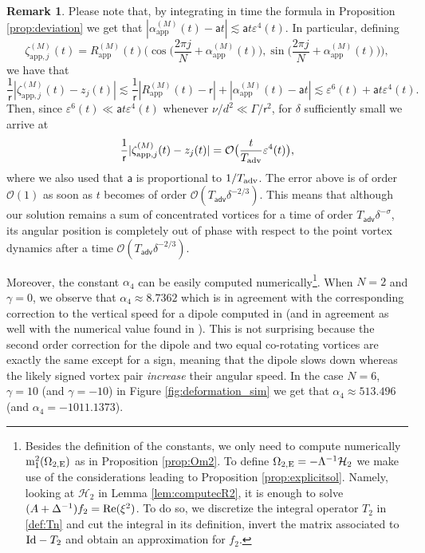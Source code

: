 \documentclass[11pt,reqno,a4paper]{amsart}
\def\eps{\varepsilon}
\def\Re{{\rm Re}}
\newcommand{\cH}{\mathcal{H}}
\newcommand{\cO}{\mathcal{O}}
\newcommand{\adv}{\mathsf{adv}}
\newcommand{\app}{\mathrm{app}}
\newcommand{\mrm}{\mathrm{m}}
\newcommand{\1}{\mathbbm{1}}
\theoremstyle{definition}
\newtheorem{remark}[proposition]{Remark}
\theoremstyle{definition}
\numberwithin{equation}{section}
\newcommand{\Mapp}[2]{#1^{(#2)}_\mathrm{app}}
\begin{document}
\begin{remark}\label{rem:delta23}
    Please note that, by integrating in time the formula in Proposition \ref{prop:deviation} we get that
    $|\Mapp{\alpha}{M}(t) - \mathsf{a}t| \lesssim \mathsf{a} t \eps^4(t)$. In particular, defining
    \begin{equation}
        \zeta^{(M)}_{\app,j}(t) = \Mapp{R}{M}(t)\Big(\cos\Big(\frac{2\pi j}{N}+\Mapp{\alpha}{M}(t)\Big) ,\sin\Big(\frac{2\pi j}{N}+\Mapp{\alpha}{M}(t) \Big) \Big),
    \end{equation}
    we have that
    \begin{equation}
        \frac{1}{\mathsf{r}}|\zeta^{(M)}_{\app,j}(t) - z_j(t)| \lesssim \frac{1}{\mathsf{r}}|\Mapp{R}{M}(t)-\mathsf{r}|+ | \Mapp{\alpha}{M}(t) - \mathsf{a}t| \lesssim  \eps^6(t)+ \mathsf{a}t \eps^4(t).
    \end{equation}
    Then, since $\eps^6(t)\ll \mathsf{a}t\eps^4(t)$ whenever $\nu/d^2\ll \Gamma/\mathsf{r}^2$, for $\delta$ sufficiently small we arrive at
        \begin{equation}
        \frac{1}{\mathsf{r}}|\zeta^{(M)}_{\app,j}(t) - z_j(t)| =\cO\big(\frac{t}{T_{\rm adv}} \eps^4(t)\big),
    \end{equation}
where we also used that $\mathsf{a}$ is proportional to $1/T_{\rm adv}$.
    The error above is of order $\cO(1)$ as soon as $t$ becomes of order $\cO(T_\adv \delta^{-2/3})$. This means that although our solution remains a sum of concentrated vortices for a time of order $T_\adv\delta^{-\sigma}$, its angular position is completely out of phase with respect to the point vortex dynamics after a time $\cO(T_\adv \delta^{-2/3})$.

    Moreover, the constant $\alpha_4$ can be easily computed numerically\footnote{Besides  the definition of the constants, we only need to compute numerically $\mrm^2_1(\Omega_{2,\rm E})$ as in Proposition \ref{prop:Om2}. To define $\Omega_{2,\rm E}=-\Lambda^{-1}\cH_2$ we make use of the considerations leading to Proposition \ref{prop:explicitsol}. Namely, looking at $\cH_2$ in Lemma \ref{lem:computecR2}, it is enough to solve $(A+\Delta^{-1})f_2=\Re(\xi^2)$. To do so, we discretize the integral operator $T_2$ in \cref{def:Tn} and cut the integral in its definition, invert the matrix associated to ${\rm Id}-T_2$ and obtain an approximation for $f_2$.}. When $N=2$ and $\gamma=0$, we observe that $\alpha_4\approx 8.7362$ which is in agreement with the corresponding correction to the vertical speed for a dipole computed in \cite{HaNaFu2018} (and in agreement as well with the numerical value found in \cite{dolce2024long}). This is not surprising because the second order correction for the dipole and two equal co-rotating vortices are exactly the same except for a sign, meaning that the dipole slows down whereas the likely signed vortex pair \emph{increase} their angular speed. In the case $N=6$, $\gamma=10$ (and $\gamma=-10$) in Figure \ref{fig:deformation_sim} we get that $\alpha_4\approx 513.496$ (and $\alpha_4=-1011.1373$). 
    

\end{remark}
\end{document}
